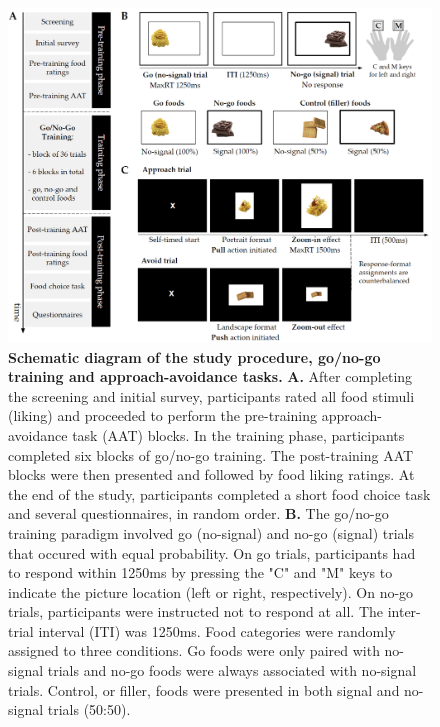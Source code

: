 \documentclass[man,floatsintext]{apa6}
\begin{document}
\begin{figure} [!htb]
\centering
\includegraphics[width=\linewidth]{figures/Figure1.png}
\caption{\textbf{Schematic diagram of the study procedure, go/no-go training and approach-avoidance tasks.} \textbf{A.} After completing the screening and initial survey, participants rated all food stimuli (liking) and proceeded to perform the pre-training approach-avoidance task (AAT) blocks. In the training phase, participants completed six blocks of go/no-go training. The post-training AAT blocks were then presented and followed by food liking ratings. At the end of the study, participants completed a short food choice task and several questionnaires, in random order. \textbf{B.} The go/no-go training paradigm involved go (no-signal) and no-go (signal) trials that occured with equal probability. On go trials, participants had to respond within 1250ms by pressing the "C" and "M" keys to indicate the picture location (left or right, respectively). On no-go trials, participants were instructed not to respond at all. The inter-trial interval (ITI) was 1250ms. Food categories were randomly assigned to three conditions. Go foods were only paired with no-signal trials and no-go foods were always associated with no-signal trials. Control, or filler, foods were presented in both signal and no-signal trials (50:50).}
\label{fig:procedure}
\end{figure}

\clearpage
\end{document}

